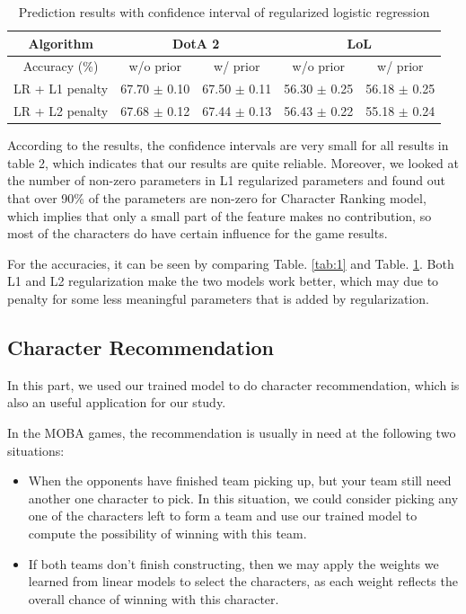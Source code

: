 \documentclass{article} %
\begin{document}
\begin{table}[h]
\center
{}
\caption{Prediction results with confidence interval of regularized logistic regression}
\begin{tabular}{|c |c |c |c |c |}
\hline
Algorithm & \multicolumn{2}{c|}{DotA 2}    & \multicolumn{2}{c|}{LoL}   \\
\hline
Accuracy (\%)                       & w/o prior   & w/ prior  & w/o prior  & w/ prior  \\ \hline
LR + L1 penalty  & 67.70 $\pm$ 0.10    & 67.50 $\pm$ 0.11     & 56.30 $\pm$ 0.25  & 56.18 $\pm$ 0.25     \\ \hline
LR + L2 penalty   & 67.68 $\pm$ 0.12   & 67.44 $\pm$ 0.13  & 56.43 $\pm$ 0.22  & 55.18 $\pm$ 0.24 \\ \hline
\end{tabular} \label{tab:2}
\end{table}

According to the results, the confidence intervals are very small for all results in table 2, which indicates that our results are quite reliable. Moreover, we looked at the number of non-zero parameters in L1 regularized parameters and found out that over 90\% of the parameters are non-zero for Character Ranking model, which implies that only a small part of the feature makes no contribution, so most of the characters do have certain influence for the game results.

For the accuracies, it can be seen by comparing Table. \ref{tab:1} and Table. \ref{tab:2}. Both L1 and L2 regularization make the two models work better, which may due to penalty for some less meaningful parameters that is added by regularization.

\subsection{Character Recommendation}

In this part, we used our trained model to do character recommendation, which is also an useful application for our study.

In the MOBA games, the recommendation is usually in need at the following two situations:
\begin{itemize}
  \item When the opponents have finished team picking up, but your team still need another one character to pick. In this situation, we could consider picking any one of the characters left to form a team and use our trained model to compute the possibility of winning with this team.
  \item If both teams don't finish constructing, then we may apply the weights we learned from linear models to select the characters, as each weight reflects the overall chance of winning with this character.
\end{itemize}
\end{document}
